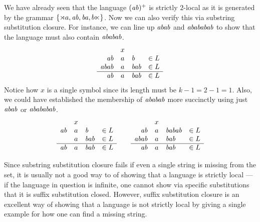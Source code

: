 \begin{examplebox}
    We have already seen that the language $(\mathit{ab})^+$ is strictly $2$-local as it is generated by the grammar $\left \{ \rtimes a, \mathit{ab}, \mathit{ba}, b \ltimes \right \}$.
    Now we can also verify this via substring substitution closure.
    For instance, we can line up $\mathit{abab}$ and $\mathit{abababab}$ to show that the language must also contain $\mathit{ababab}$.
    \[
        \begin{array}{rcll}
                          & x &              & \\
            \mathit{ab}   & a & \mathit{b}   & \in L\\
            \mathit{abab} & a & \mathit{bab} & \in L\\\hline
            \mathit{ab}   & a & \mathit{bab} & \in L
        \end{array}
    \]
    Notice how $x$ is a single symbol since its length must be $k-1 = 2 -1 = 1$.
    Also, we could have established the membership of $\mathit{ababab}$ more succinctly using just $\mathit{abab}$ or $\mathit{abababab}$.
    \[
        \begin{array}{rcll}
                        & x &              & \\
            \mathit{ab} & a & \mathit{b}   & \in L\\
                        & a & \mathit{bab} & \in L\\\hline
            \mathit{ab} & a & \mathit{bab} & \in L
        \end{array}
        \qquad
        \begin{array}{rcll}
                          & x &                & \\
            \mathit{ab}   & a & \mathit{babab} & \in L\\
            \mathit{abab} & a & \mathit{bab}   & \in L\\\hline
            \mathit{ab}   & a & \mathit{bab}   & \in L
        \end{array}
    \]
\end{examplebox}
%
Since substring substitution closure fails if even a single string is missing from the set, it is usually not a good way to of showing that a language is strictly local --- if the language in question is infinite, one cannot show via specific substitutions that it is suffix substitution closed.
However, suffix substitution closure is an excellent way of showing that a language is not strictly local by giving a single example for how one can find a missing string.
